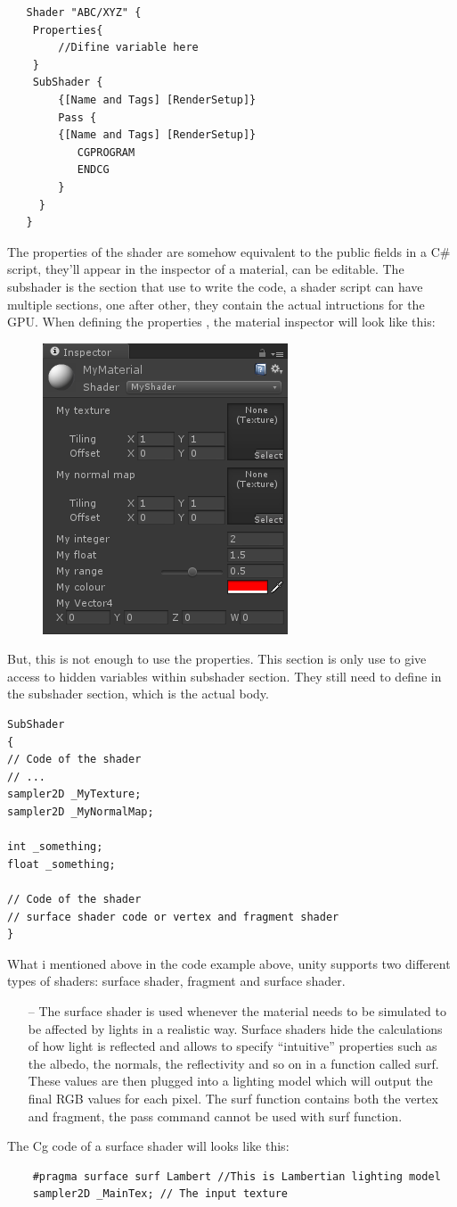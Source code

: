 \documentclass[a4paper, 13pt]{extarticle}
\begin{document}
{   \begin{lstlisting}
   Shader "ABC/XYZ" {
   	Properties{
   		//Difine variable here	
   	}
   	SubShader {
   		{[Name and Tags] [RenderSetup]}
   		Pass {
   		{[Name and Tags] [RenderSetup]}
		   CGPROGRAM
		   ENDCG
   		}
  	 }
   }
   \end{lstlisting}
  The properties of the shader are somehow equivalent to the public fields in a C\# script, they'll appear in the inspector of a material, can be editable. The subshader is the section that use to write the code, a shader script can have multiple sections, one after other, they contain the actual intructions for the GPU. When defining the properties , the material inspector will look like this: 
   \begin{figure}[h]
  	\begin{minipage}{1\textwidth}
  		\centering
  		\includegraphics[width=0.2\linewidth]{intructions/Inspector_material.png}
  		\centering
  	\end{minipage}
  \end{figure}
But, this is not enough to use the properties. This section is only use to give access to hidden variables within subshader section. They still need to define in the subshader section, which is the actual body. 
\begin{lstlisting}
SubShader
{
// Code of the shader
// ...
sampler2D _MyTexture;
sampler2D _MyNormalMap;

int _something;
float _something;

// Code of the shader
// surface shader code or vertex and fragment shader
}
\end{lstlisting}
What i mentioned above in the code example above, unity supports two different types of shaders: surface shader, fragment and surface shader.
\begin{itemize}
	\item[--] The surface shader is used whenever the material needs to be simulated to be affected by lights in a realistic way. Surface shaders hide the calculations of how light is reflected and allows to specify “intuitive” properties such as the albedo, the normals, the reflectivity and so on in a function called surf. These values are then plugged into a lighting model which will output the final RGB values for each pixel. The surf function contains both the vertex and fragment, the pass command cannot be used with surf function.
\end{itemize}
 	The Cg code of a surface shader will looks like this: 
 	\begin{lstlisting}
 	#pragma surface surf Lambert //This is Lambertian lighting model
 	sampler2D _MainTex; // The input texture
 	

\end{lstlisting}}
\end{document}
